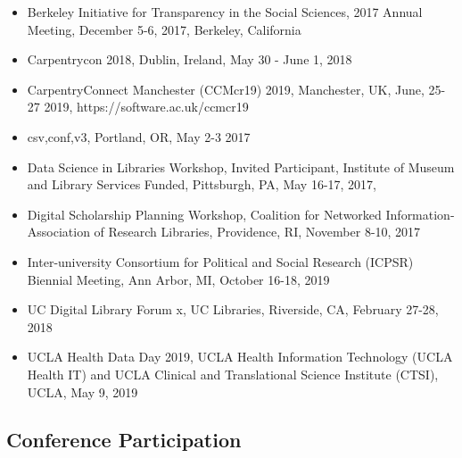 \begin{itemize}[label={},leftmargin=!,labelindent=5pt,itemindent=-15pt]
  \item Berkeley Initiative for Transparency in the Social Sciences, 2017 Annual Meeting, December 5-6, 2017, Berkeley, California
  \item Carpentrycon 2018, Dublin, Ireland, May 30 - June 1, 2018
  \item CarpentryConnect Manchester (CCMcr19) 2019, Manchester, UK, June, 25-27 2019, https://software.ac.uk/ccmcr19
  \item csv,conf,v3, Portland, OR, May 2-3 2017
  \item Data Science in Libraries Workshop, Invited Participant, Institute of Museum and Library Services Funded, Pittsburgh, PA, May 16-17, 2017,
  \item Digital Scholarship Planning Workshop, Coalition for Networked Information-Association of Research Libraries, Providence, RI, November 8-10, 2017
  \item Inter-university Consortium for Political and Social Research (ICPSR) Biennial Meeting, Ann Arbor, MI, October 16-18, 2019
  \item UC Digital Library Forum x, UC Libraries, Riverside, CA, February 27-28, 2018
  \item UCLA Health Data Day 2019, UCLA Health Information Technology (UCLA Health IT) and UCLA Clinical and Translational Science Institute (CTSI), UCLA, May 9, 2019
\end{itemize}


\subsection{Conference Participation}

\nocite{*}
\printbibliography[keyword={outlib-conf-part},title={Conference Participation},heading=none]


